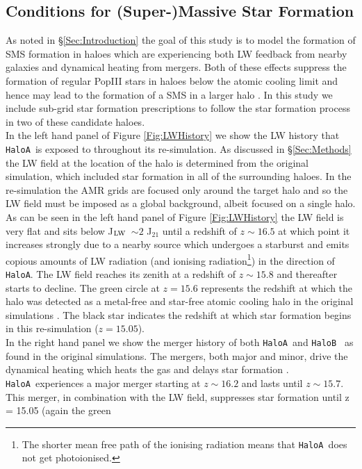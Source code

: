 \documentclass[graphics, twocolumn, usenatbib]{mn2e}
\newcommand{\JLW} {J$_{\rm LW}$}
\newcommand{\ha} {\texttt{HaloA~}}
\newcommand{\hb} {\texttt{HaloB~}}
\newcommand{\hac} {\texttt{HaloA}}
\begin{document}
\subsection{Conditions for (Super-)Massive Star Formation}
As noted in \S \ref{Sec:Introduction} the goal of this study is to model the formation of SMS formation in haloes which are experiencing both LW feedback from nearby galaxies and dynamical heating from mergers. Both of these effects suppress the formation of regular PopIII stars in haloes
below the atomic cooling limit and hence may lead to the formation of a SMS in a larger halo  \citep[as was found in][]{Wise_2019}. In this study we include 
sub-grid star formation prescriptions to follow the star formation process in 
two of these candidate haloes.\\
\indent In the left hand panel of Figure \ref{Fig:LWHistory} we show the LW history that \ha is
exposed to throughout its re-simulation. As discussed in \S \ref{Sec:Methods} the LW field at the
location of the halo is determined from the original simulation, which included star formation
in all of the surrounding haloes. In the re-simulation the AMR grids are focused only around the
target halo and so the LW field must be imposed as a global background, albeit focused on a single
halo. As can be seen in the left hand panel of Figure \ref{Fig:LWHistory} the LW field is very flat and sits below \JLW \ $\sim 2$
J$_{21}$ until a redshift of $z \sim 16.5$ at which point it increases strongly due to a nearby source
which undergoes a starburst and emits copious amounts of LW radiation
(and ionising radiation\footnote{The
  shorter mean free path of the ionising radiation means that \ha does not get photoionised.}) in the
direction of \hac. The LW field reaches its zenith at a redshift of $z \sim 15.8$ and thereafter
starts to decline. The green circle at $z = 15.6$ represents the redshift at which the halo was
detected as a metal-free and star-free atomic cooling halo in the original simulations
\citep[see][for details]{Regan_2020}. The black star indicates the redshift at which star formation begins in this
re-simulation ($z = 15.05$). \\
\indent In the right hand panel we show the merger history of both \ha and \hb
as found in the original simulations. The mergers, both major and minor, drive the dynamical heating
which heats the gas and delays star formation \citep{Wise_2019}. 
\ha experiences a major merger starting at $z \sim 16.2$ and lasts until $z \sim 15.7$. This
merger, in combination with the LW field, suppresses star formation until z = 15.05 (again the green
\end{document}
